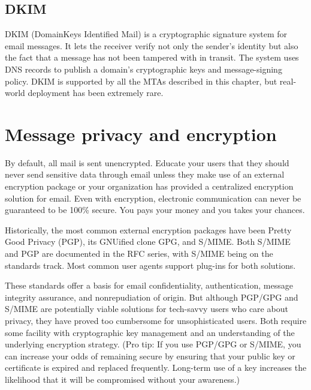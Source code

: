 \protect\hypertarget{part0026_split_016.html}{}{}

\hypertarget{part0026_split_016.htmlux5cux23_idContainer1247}{}
\hypertarget{part0026_split_016.htmlux5cux23calibre_pb_15}{%
\subsection[DKIM]{\texorpdfstring{\protect\hypertarget{part0026_split_016.htmlux5cux23_idTextAnchor1025}{}{}DKIM}{DKIM}}\label{part0026_split_016.htmlux5cux23calibre_pb_15}}

\protect\hypertarget{part0026_split_016.htmlux5cux23_idIndexMarker2452}{}{}DKIM
(DomainKeys Identified Mail) is a cryptographic signature system for
email messages. It lets the receiver verify not only the sender's
identity but also the fact that a message has not been tampered with in
transit. The system uses DNS records to publish a domain's cryptographic
keys and message-signing policy. DKIM is supported by all the MTAs
described in this chapter, but real-world deployment has been extremely
rare.

\section{Message privacy and encryption}

\protect\hypertarget{part0026_split_017.htmlux5cux23_idIndexMarker2453}{}{}\protect\hypertarget{part0026_split_017.htmlux5cux23_idIndexMarker2454}{}{}By
default, all mail is sent unencrypted. Educate your users that they
should never send sensitive data through email unless they make use of
an external encryption package or your organization has provided a
centralized encryption solution for email. Even {with} encryption,
electronic communication can never be guaranteed to be 100\% secure. You
pays your money and you takes your chances.

Historically, the most common external encryption packages have been
\protect\hypertarget{part0026_split_017.htmlux5cux23_idIndexMarker2455}{}{}\protect\hypertarget{part0026_split_017.htmlux5cux23_idIndexMarker2456}{}{}Pretty
Good Privacy (PGP), its GNUified clone
\protect\hypertarget{part0026_split_017.htmlux5cux23_idIndexMarker2457}{}{}GPG,
and
\protect\hypertarget{part0026_split_017.htmlux5cux23_idIndexMarker2458}{}{}S/MIME.
Both S/MIME and PGP are documented in the RFC series, with S/MIME being
on the standards track. Most common user agents support plug-ins for
both solutions.

These standards offer a basis for email confidentiality, authentication,
message integrity assurance, and nonrepudiation of origin.{ }But
although PGP/GPG and {S/MIME} are potentially viable solutions for
tech-savvy users who care about privacy, they have proved too cumbersome
for unsophisticated users. Both require some facility with cryptographic
key management and an understanding of the underlying encryption
strategy. (Pro tip: If you use PGP/GPG or S/MIME, you can increase your
odds of remaining secure by ensuring that your public key or certificate
is expired and replaced frequently. Long-term use of a key increases the
likelihood that it will be compromised without your awareness.)

